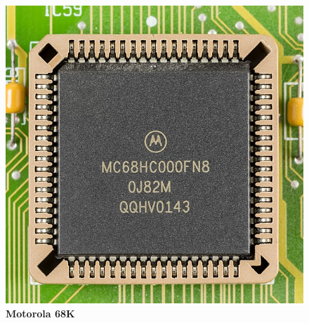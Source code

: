 \begin{figure}[htb]
	\centering
	\includegraphics[scale = 0.15]{Graphics/Motorola_MC68HC000FN8-0695.jpg}
	\caption{\textbf{Motorola 68K}}
	\label{fig:17}
\end{figure}
